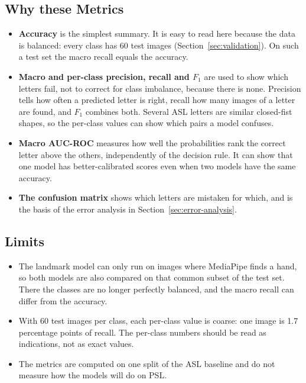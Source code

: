 \subsection{Why these Metrics}
\begin{itemize}
  \item \textbf{Accuracy} is the simplest summary. It is easy to read here because the data is balanced: every class has 60 test images (Section~\ref{sec:validation}). On such a test set the macro recall equals the accuracy.
  \item \textbf{Macro and per-class precision, recall and $F_1$} are used to show which letters fail, not to correct for class imbalance, because there is none. Precision tells how often a predicted letter is right, recall how many images of a letter are found, and $F_1$ combines both. Several ASL letters are similar closed-fist shapes, so the per-class values can show which pairs a model confuses.
  \item \textbf{Macro AUC-ROC} measures how well the probabilities rank the correct letter above the others, independently of the decision rule. It can show that one model has better-calibrated scores even when two models have the same accuracy.
  \item \textbf{The confusion matrix} shows which letters are mistaken for which, and is the basis of the error analysis in Section~\ref{sec:error-analysis}.
\end{itemize}

\subsection{Limits}
\begin{itemize}
  \item The landmark model can only run on images where MediaPipe finds a hand, so both models are also compared on that common subset of the test set. There the classes are no longer perfectly balanced, and the macro recall can differ from the accuracy.
  \item With 60 test images per class, each per-class value is coarse: one image is 1.7 percentage points of recall. The per-class numbers should be read as indications, not as exact values.
  \item The metrics are computed on one split of the ASL baseline and do not measure how the models will do on PSL.
\end{itemize}
